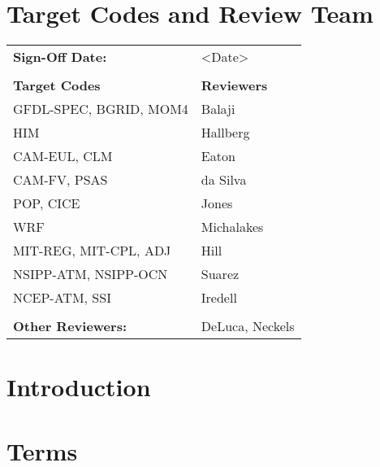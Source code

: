 \section{Target Codes and Review Team}

\begin{tabular}{l l}

{\bf Sign-Off Date:}          & <Date> \\ \\

{\bf Target Codes}            & {\bf Reviewers} \\
GFDL-SPEC, BGRID, MOM4        & Balaji \\ 
HIM                           & Hallberg \\
CAM-EUL, CLM                  & Eaton \\
CAM-FV, PSAS                  & da Silva\\
POP, CICE                     & Jones \\
WRF                           & Michalakes \\
MIT-REG, MIT-CPL, ADJ         & Hill \\
NSIPP-ATM, NSIPP-OCN          & Suarez \\
NCEP-ATM, SSI                 & Iredell \\ \\

{\bf Other Reviewers:}        & DeLuca, Neckels

\end{tabular}


\section{Introduction}
%



\section{\longname Terms}


